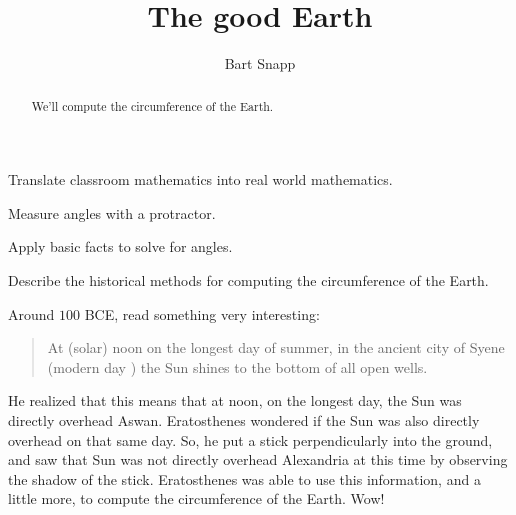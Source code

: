 \documentclass[noauthor,nooutcomes,handout,12pt]{ximera}
\title{The good Earth}
\author{Bart Snapp}
\begin{document}
\begin{abstract}
  We'll compute the circumference of the Earth.
\end{abstract}
\maketitle

\begin{listOutcomes}
\item Translate classroom mathematics into real world mathematics. 
\item Measure angles with a protractor.
\item Apply basic facts to solve for angles.
\item Describe the historical methods for computing the circumference
    of the Earth.
\end{listOutcomes}
%


  Around $100$ BCE,  read something very interesting:
  \begin{quote}
    At (solar) noon on the longest day of summer, in the ancient city of Syene
    (modern day ) the
    Sun shines to the bottom of all open wells.
  \end{quote}
  He realized that this means
  that at noon, on the longest day, the Sun was directly overhead
  Aswan. Eratosthenes wondered if the Sun was also directly overhead
   on that
  same day. So, he put a stick perpendicularly into the ground, and
  saw that Sun was not directly overhead Alexandria at this time by
  observing the shadow of the stick. Eratosthenes was able to use this
  information, and a little more, to compute the circumference of the
  Earth. Wow!
\end{document}
